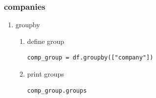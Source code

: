 \documentclass[11pt]{article}
\begin{document}
\subsubsection{companies}
\label{sec:orgad4b5d7}
\begin{enumerate}
\item groupby
\label{sec:orgea3f6ee}
\begin{enumerate}
\item define group
\label{sec:orgb804f8f}
\begin{verbatim}
comp_group = df.groupby(["company"])
\end{verbatim}

\item print groups
\label{sec:org7eec9ec}
\begin{verbatim}
comp_group.groups
\end{verbatim}


\end{enumerate}
\end{enumerate}
\end{document}
